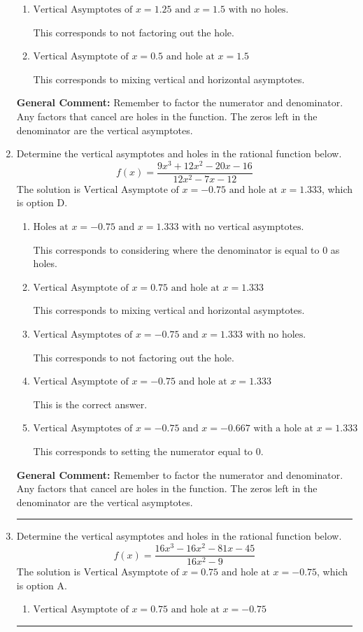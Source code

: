 \documentclass{extbook}[14pt]
\newcommand{\litem}[1]{\item #1

\rule{\textwidth}{0.4pt}}
\begin{document}
\begin{enumerate}
{\begin{enumerate}[label=\Alph*.]
This corresponds to considering where the denominator is equal to 0 as holes.
\item \( \text{Vertical Asymptotes of } x = 1.25 \text{ and } x = 1.5 \text{ with no holes.} \)

This corresponds to not factoring out the hole.
\item \( \text{Vertical Asymptote of } x = 0.5 \text{ and hole at } x = 1.5 \)

This corresponds to mixing vertical and horizontal asymptotes.
\end{enumerate}

\textbf{General Comment:} Remember to factor the numerator and denominator. Any factors that cancel are holes in the function. The zeros left in the denominator are the vertical asymptotes.
}
\litem{
Determine the vertical asymptotes and holes in the rational function below.
\[ f(x) = \frac{9x^{3} +12 x^{2} -20 x -16}{12x^{2} -7 x -12} \]The solution is \( \text{Vertical Asymptote of } x = -0.75 \text{ and hole at } x = 1.333 \), which is option D.\begin{enumerate}[label=\Alph*.]
\item \( \text{Holes at } x = -0.75 \text{ and } x = 1.333 \text{ with no vertical asymptotes.} \)

This corresponds to considering where the denominator is equal to 0 as holes.
\item \( \text{Vertical Asymptote of } x = 0.75 \text{ and hole at } x = 1.333 \)

This corresponds to mixing vertical and horizontal asymptotes.
\item \( \text{Vertical Asymptotes of } x = -0.75 \text{ and } x = 1.333 \text{ with no holes.} \)

This corresponds to not factoring out the hole.
\item \( \text{Vertical Asymptote of } x = -0.75 \text{ and hole at } x = 1.333 \)

This is the correct answer.
\item \( \text{Vertical Asymptotes of } x = -0.75 \text{ and } x = -0.667 \text{ with a hole at } x = 1.333 \)

This corresponds to setting the numerator equal to 0.
\end{enumerate}

\textbf{General Comment:} Remember to factor the numerator and denominator. Any factors that cancel are holes in the function. The zeros left in the denominator are the vertical asymptotes.
}
\litem{
Determine the vertical asymptotes and holes in the rational function below.
\[ f(x) = \frac{16x^{3} -16 x^{2} -81 x -45}{16x^{2} -9} \]The solution is \( \text{Vertical Asymptote of } x = 0.75 \text{ and hole at } x = -0.75 \), which is option A.\begin{enumerate}[label=\Alph*.]
\item \( \text{Vertical Asymptote of } x = 0.75 \text{ and hole at } x = -0.75 \)


\end{enumerate}}
\end{enumerate}
\end{document}
